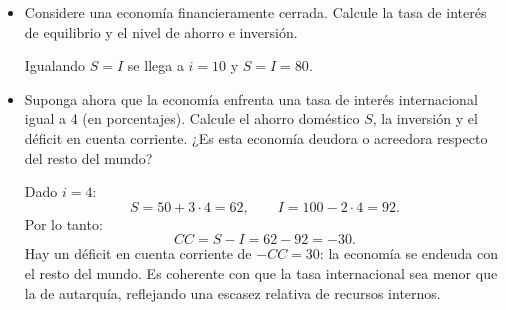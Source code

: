 \documentclass[a4paper]{article}
\begin{document}
\begin{itemize}
    \item[a)] Considere una econom\'ia financieramente cerrada. Calcule la tasa de inter\'es de equilibrio y el nivel de ahorro e inversi\'on.

    \begin{solution}
        Igualando $S = I$ se llega a $i = 10$ y $S = I = 80$.

        \begin{center}
        \end{center}
    \end{solution}

    \item[b)] Suponga ahora que la econom\'ia enfrenta una tasa de inter\'es internacional igual a 4 (en porcentajes). Calcule el ahorro dom\'estico $S$, la inversi\'on y el d\'eficit en cuenta corriente. ¿Es esta econom\'ia deudora o acreedora respecto del resto del mundo?

    \begin{solution}
        Dado \( i = 4 \):
        \[
        S = 50 + 3 \cdot 4 = 62, \qquad I = 100 - 2 \cdot 4 = 92.
        \]
        Por lo tanto:
        \[
        CC = S - I = 62 - 92 = -30.
        \]
        Hay un d\'eficit en cuenta corriente de \( -CC = 30 \): la econom\'ia se endeuda con el resto del mundo. Es coherente con que la tasa internacional sea menor que la de autarqu\'ia, reflejando una escasez relativa de recursos internos.


\end{solution}
\end{itemize}
\end{document}
